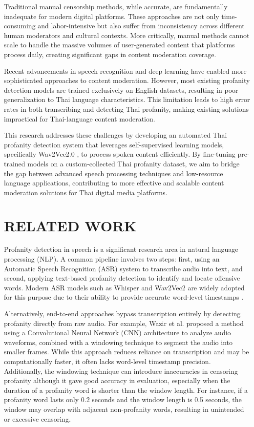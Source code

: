 \documentclass[11pt]{article}
\begin{document}
Traditional manual censorship methods, while accurate, are fundamentally inadequate for 
modern digital platforms. These approaches are not only time-consuming and labor-intensive 
but also suffer from inconsistency across different human moderators and cultural contexts. 
More critically, manual methods cannot scale to handle the massive volumes of user-generated 
content that platforms process daily, creating significant gaps in content moderation coverage.

Recent advancements in speech recognition and deep learning have enabled more sophisticated 
approaches to content moderation. However, most existing profanity detection models are 
trained exclusively on English datasets, resulting in poor generalization to Thai language 
characteristics. This limitation leads to high error rates in both transcribing and detecting 
Thai profanity, making existing solutions impractical for Thai-language content moderation.

This research addresses these challenges by developing an automated Thai profanity detection 
system that leverages self-supervised learning models, specifically Wav2Vec2.0 \cite{baevski2020wav2vec}, to process 
spoken content efficiently. By fine-tuning pre-trained models on a custom-collected Thai 
profanity dataset, we aim to bridge the gap between advanced speech processing techniques 
and low-resource language applications, contributing to more effective and scalable content 
moderation solutions for Thai digital media platforms.

\section{RELATED WORK}
Profanity detection in speech is a significant research area in natural language processing (NLP). 
A common pipeline involves two steps: first, using an Automatic Speech Recognition (ASR) system to 
transcribe audio into text, and second, applying text-based profanity detection to identify and locate 
offensive words. Modern ASR models such as Whisper \cite{bain2023whisperx} and Wav2Vec2 are widely adopted for this purpose due 
to their ability to provide accurate word-level timestamps \cite{baath2024offline}.

Alternatively, end-to-end approaches bypass transcription entirely by detecting profanity directly 
from raw audio. For example, Wazir et al. \cite{wazir2022deep} proposed a method using a Convolutional 
Neural Network (CNN) architecture to analyze audio waveforms, combined with a windowing technique to segment 
the audio into smaller frames. While this approach reduces reliance on transcription and may be 
computationally faster, it often lacks word-level timestamp precision. Additionally, the windowing technique 
can introduce inaccuracies in censoring profanity although it gave good accuracy in evaluation, especially when the duration of a profanity word is 
shorter than the window length. For instance, if a profanity word lasts only 0.2 seconds and the window 
length is 0.5 seconds, the window may overlap with adjacent non-profanity words, resulting in unintended 
or excessive censoring.
\end{document}
